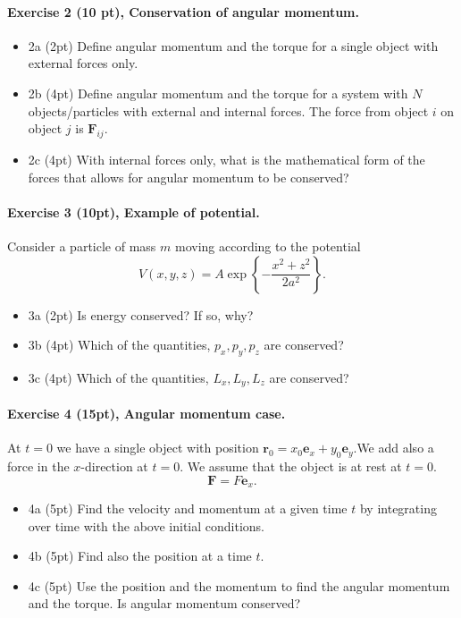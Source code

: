 \documentclass[%
oneside,                 %
final,                   %
10pt]{article}
\begin{document}
\noindent
\paragraph{Exercise 2 (10 pt), Conservation of angular momentum.}
\begin{itemize}
\item 2a (2pt) Define angular momentum and the torque for a single object with external forces only. 

\item 2b (4pt) Define angular momentum and the torque for a system with $N$ objects/particles  with external and internal forces. The force from object $i$ on object $j$ is $\bm{F}_{ij}$.

\item 2c (4pt) With internal forces only, what is the mathematical form of the forces that allows for angular momentum to be conserved? 
\end{itemize}

\noindent
\paragraph{Exercise 3 (10pt), Example of potential.}
Consider a particle of mass $m$ moving according to the potential
\[
V(x,y,z)=A\exp\left\{-\frac{x^2+z^2}{2a^2}\right\}.
\]

\begin{itemize}
\item 3a (2pt) Is energy conserved? If so, why? 

\item 3b (4pt) Which of  the quantities, $p_x,p_y,p_z$ are conserved?

\item 3c (4pt) Which of  the quantities, $L_x,L_y,L_z$ are conserved?
\end{itemize}

\noindent
\paragraph{Exercise 4 (15pt), Angular momentum case.}
At $t=0$ we have a single object with position $\bm{r}_0=x_0\bm{e}_x+y_0\bm{e}_y$.We add also a force in the $x$-direction at $t=0$. We assume that the object is at rest at $t=0$. 
\[
\bm{F} = F\bm{e}_x.
\]

\begin{itemize}
\item 4a (5pt) Find the velocity and momentum at a given time $t$ by integrating over time with the above initial conditions.

\item 4b (5pt) Find also the position at a time $t$. 

\item 4c (5pt) Use the position and the momentum to find the angular momentum and the torque. Is angular momentum conserved?
\end{itemize}
\end{document}
